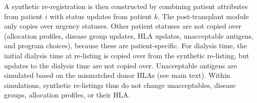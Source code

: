 A synthetic re-registration is then constructed by combining patient attributes from patient $i$ with status updates from patient $k$. The post-transplant module only copies over urgency statuses. Other patient statuses are not copied over (allocation profiles, disease group updates, HLA updates, unacceptable antigens, and program choices), because these are patient-specific. For dialysis time, the initial dialysis time at re-listing is copied over from the synthetic re-listing, but updates to the dialysis time are not copied over. Unacceptable antigens are simulated based on the mismatched donor HLAs (see main text). Within simulations, synthetic re-listings thus do not change unacceptables, disease groups, allocation profiles, or their HLA.


